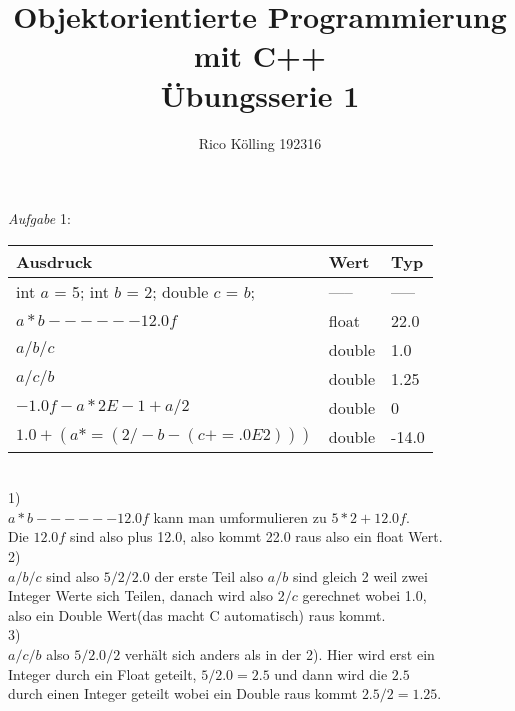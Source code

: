 \documentclass[12pt]{article}
\title{Objektorientierte Programmierung mit C++ \\ Übungsserie 1}
\author{Rico Kölling 192316}
\date{}
\begin{document}
\maketitle
\textit{Aufgabe} 1: \\ [16pt]
	\begin{tabular}{l|l|l|}

		Ausdruck & Wert & Typ\\ \hline
		int $a$ = 5; int $b$ = 2; double $c$ = $b$; & ----- & ----- \\ 		\hline
		$a * b - - - - - - 12.0f$ & float & 22.0 \\ \hline
		$a / b / c $ & double & 1.0 \\ \hline
		$a / c / b $ & double & 1.25 \\ \hline
		$-1.0f - a*2 E -1 + a/ 2$ & double & 0 \\ \hline
		$1.0 + (a *= ( 2 / - b -(c += .0E2)))$ & double & -14.0 \\ \hline

	\end{tabular}
	\\ [4pt]
1) \\ [4pt]
\hspace*{3mm}$ a * b - - - - - - 12.0f$ kann man umformulieren zu $5 * 2 + 12.0f$.\\ \hspace*{3mm}Die $12.0f$ sind also plus 12.0, also kommt 22.0 raus also ein float Wert.\\ [4pt]
2)\\[4pt]
\hspace*{3mm}$a / b / c$ sind also $ 5 / 2 /  2.0 $ der erste Teil also $a /b$ sind gleich 2 weil zwei \\
\hspace*{3mm}Integer Werte sich Teilen, danach wird also $2 / c $ gerechnet wobei 1.0,\\
\hspace*{3mm}also ein Double Wert(das macht C automatisch) raus kommt.\\[4pt]
3)\\ [4pt]
\hspace*{3mm}$a / c / b$ also $ 5 / 2.0 / 2$ verhält sich anders als in der 2). Hier wird erst ein\\ 
\hspace*{3mm}Integer durch ein Float geteilt, $ 5 / 2.0 = 2.5 $ und dann wird die $2.5$ \\
\hspace*{3mm}durch einen Integer geteilt wobei ein Double raus kommt $2.5 / 2 = 1.25$. \\ [4pt]
\end{document}
